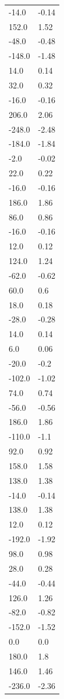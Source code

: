 \begin{longtable}{ll}
-14.0 & -0.14 \\
152.0 & 1.52 \\
-48.0 & -0.48 \\
-148.0 & -1.48 \\
14.0 & 0.14 \\
32.0 & 0.32 \\
-16.0 & -0.16 \\
206.0 & 2.06 \\
-248.0 & -2.48 \\
-184.0 & -1.84 \\
-2.0 & -0.02 \\
22.0 & 0.22 \\
-16.0 & -0.16 \\
186.0 & 1.86 \\
86.0 & 0.86 \\
-16.0 & -0.16 \\
12.0 & 0.12 \\
124.0 & 1.24 \\
-62.0 & -0.62 \\
60.0 & 0.6 \\
18.0 & 0.18 \\
-28.0 & -0.28 \\
14.0 & 0.14 \\
6.0 & 0.06 \\
-20.0 & -0.2 \\
-102.0 & -1.02 \\
74.0 & 0.74 \\
-56.0 & -0.56 \\
186.0 & 1.86 \\
-110.0 & -1.1 \\
92.0 & 0.92 \\
158.0 & 1.58 \\
138.0 & 1.38 \\
-14.0 & -0.14 \\
138.0 & 1.38 \\
12.0 & 0.12 \\
-192.0 & -1.92 \\
98.0 & 0.98 \\
28.0 & 0.28 \\
-44.0 & -0.44 \\
126.0 & 1.26 \\
-82.0 & -0.82 \\
-152.0 & -1.52 \\
0.0 & 0.0 \\
180.0 & 1.8 \\
146.0 & 1.46 \\
-236.0 & -2.36 \\

\end{longtable}
